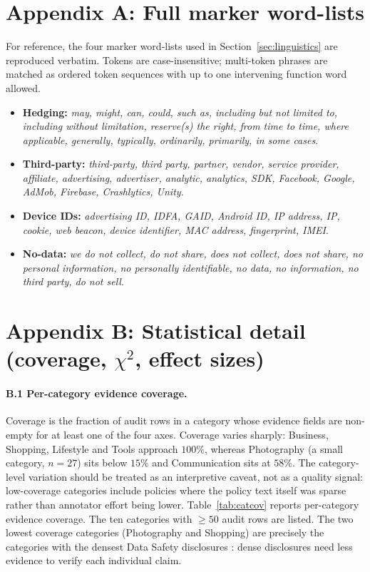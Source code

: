 \documentclass[11pt,a4paper]{article}
\begin{document}
\appendix
\section*{Appendix A: Full marker word-lists}
\label{app:wordlists}
For reference, the four marker word-lists used in
Section~\ref{sec:linguistics} are reproduced verbatim. Tokens are
case-insensitive; multi-token phrases are matched as ordered token
sequences with up to one intervening function word allowed.

\begin{itemize}[leftmargin=*,itemsep=1pt,topsep=2pt]
\item \textbf{Hedging:} \emph{may, might, can, could, such as,
including but not limited to, including without limitation, reserve(s)
the right, from time to time, where applicable, generally, typically,
ordinarily, primarily, in some cases}.
\item \textbf{Third-party:} \emph{third-party, third party, partner,
vendor, service provider, affiliate, advertising, advertiser,
analytic, analytics, SDK, Facebook, Google, AdMob, Firebase,
Crashlytics, Unity}.
\item \textbf{Device IDs:} \emph{advertising ID, IDFA, GAID, Android
ID, IP address, IP, cookie, web beacon, device identifier, MAC address,
fingerprint, IMEI}.
\item \textbf{No-data:} \emph{we do not collect, do not share, does
not collect, does not share, no personal information, no personally
identifiable, no data, no information, no third party, do not sell}.
\end{itemize}

\section*{Appendix B: Statistical detail (coverage, $\chi^{2}$, effect sizes)}
\label{app:catcov}
\paragraph{B.1 Per-category evidence coverage.}
Coverage is the fraction of audit rows in a category whose evidence
fields are non-empty for at least one of the four axes. Coverage
varies sharply: Business, Shopping, Lifestyle and Tools approach
$100\%$, whereas Photography (a small category, $n=27$) sits below
$15\%$ and Communication sits at $58\%$. The category-level
variation should be treated as an interpretive caveat, not as a
quality signal: low-coverage categories include policies where
the policy text itself was sparse rather than annotator effort being
lower.
Table~\ref{tab:catcov} reports per-category evidence coverage. The
ten categories with $\geq50$ audit rows are listed. The two lowest
coverage categories (Photography and Shopping) are precisely the
categories with the densest Data Safety disclosures
\citep{khandelwal2024unpacking}: dense disclosures need less
evidence to verify each individual claim.
\end{document}

